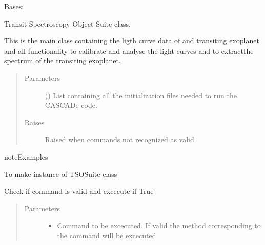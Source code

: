 \documentclass[a4paper,11pt,english]{sphinxmanual}
\begin{document}
\begin{fulllineitems}
\label{\detokenize{cascade.TSO:cascade.TSO.TSO.TSOSuite}}
Bases: 

Transit Spectroscopy Object Suite class.

This is the main class containing the ligth curve data of and transiting
exoplanet and all functionality to calibrate and analyse the light curves
and to extractthe spectrum of the transiting exoplanet.
\begin{quote}\begin{description}
\item[{Parameters}] \leavevmode
{} () \textendash{} List containing all the initialization files needed to run the
CASCADe code.

\item[{Raises}] \leavevmode
{} \textendash{} Raised when commands not recognized as valid

\end{description}\end{quote}

\begin{sphinxadmonition}{note}{Examples}

To make instance of TSOSuite class

%
\begin{sphinxVerbatim}[commandchars=\\\{\}]
  
\end{sphinxVerbatim}
\end{sphinxadmonition}

\begin{fulllineitems}
\label{\detokenize{cascade.TSO:cascade.TSO.TSO.TSOSuite.execute}}
Check if command is valid and excecute if True
\begin{quote}\begin{description}
\item[{Parameters}] \leavevmode\begin{itemize}
\item {} 
 \textendash{} Command to be excecuted. If valid the method corresponding
to the command will be excecuted


\end{itemize}
\end{description}
\end{quote}
\end{fulllineitems}
\end{fulllineitems}
\end{document}
